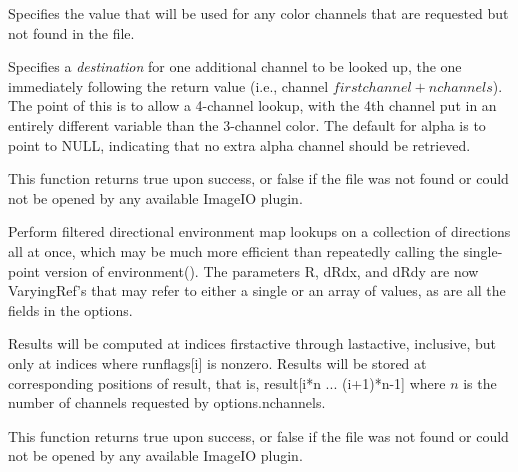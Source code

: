 \vspace{-24pt}
\vspace{10pt}
Specifies the value that will be used for any color channels that are
requested but not found in the file.
\apiend

\vspace{-24pt}
\vspace{10pt}
Specifies a \emph{destination} for one additional channel to be looked
up, the one immediately following the return value (i.e., channel
$\mathit{firstchannel}+\mathit{nchannels}$).  The point of this is to
allow a 4-channel lookup, with the 4th channel put in an entirely
different variable than the 3-channel color.  The default for {\cf
  alpha} is to point to NULL, indicating that no extra alpha channel
should be retrieved.
\apiend

This function returns {\cf true} upon success, or {\cf false} if the
file was not found or could not be opened by any available ImageIO
plugin.
\apiend


Perform filtered directional environment map lookups on a collection of
directions all at once, which may be much more efficient than repeatedly
calling the single-point version of {\cf environment()}.  The parameters
{\cf R}, {\cf dRdx}, and {\cf dRdy} are now {\cf VaryingRef}'s that may
refer to either a single or an array of values, as are all the fields in
the {\cf options}.

Results will be computed at indices {\cf firstactive} through
{\cf lastactive}, inclusive, but only at indices where {\cf runflags[i]}
is nonzero.  Results will be stored at corresponding positions of
{\cf result}, that is, {\cf result[i*n ... (i+1)*n-1]} where $n$ 
is the number of channels requested by {\cf options.nchannels}.

This function returns {\cf true} upon success, or {\cf false} if the
file was not found or could not be opened by any available ImageIO
plugin.
\apiend

